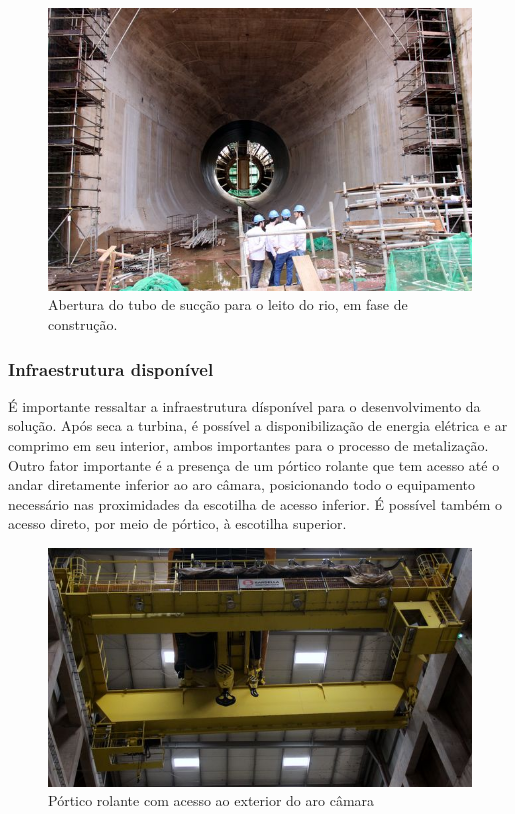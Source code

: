 \begin{figure}[H]	
	\includegraphics[width=\columnwidth]{figs/viagem/2015_04_30/Vao/img_5086}
	\caption{Abertura do tubo de sucção para o leito do rio, em fase de
	construção.}
	\label{fig::tubo_suc}
\end{figure}

\subsubsection{Infraestrutura disponível}
É importante ressaltar a infraestrutura dísponível para o desenvolvimento da solução. 
Após seca a turbina, é possível a disponibilização de energia elétrica e ar comprimo 
em seu interior, ambos importantes para o processo de metalização. Outro fator 
importante é a presença de um pórtico rolante que tem acesso até o andar diretamente 
inferior ao aro câmara, posicionando todo o equipamento necessário nas proximidades 
da escotilha de acesso inferior. É possível também o acesso direto, por meio de pórtico, 
à escotilha superior.

\begin{figure}[h!]	
	\includegraphics[width=\columnwidth]{figs/viagem/2015_04_28/UG/img_4989}
	\caption{Pórtico rolante com acesso ao exterior do aro câmara}
	\label{fig::portico}
\end{figure}






